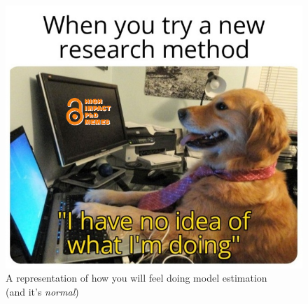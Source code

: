 \documentclass{beamer}
\begin{document}
\begin{frame}
  \begin{figure}[ht]
	\centering
	\includegraphics[width = 0.8\linewidth]{FIGURES/new_method_meme.png}
	\caption{A representation of how you will feel doing model estimation \\ (and it's \textit{normal})}
  \end{figure}
\end{frame}
\end{document}
